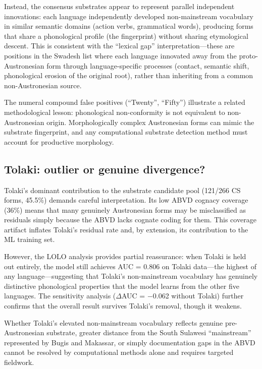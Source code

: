 \documentclass[12pt]{article}
\begin{document}
Instead, the consensus substrates appear to represent parallel independent innovations: each language independently developed non-mainstream vocabulary in similar semantic domains (action verbs, grammatical words), producing forms that share a phonological profile (the fingerprint) without sharing etymological descent.
This is consistent with the ``lexical gap'' interpretation---these are positions in the Swadesh list where each language innovated away from the proto-Austronesian form through language-specific processes (contact, semantic shift, phonological erosion of the original root), rather than inheriting from a common non-Austronesian source.

The numeral compound false positives (``Twenty'', ``Fifty'') illustrate a related methodological lesson: phonological non-conformity is not equivalent to non-Austronesian origin.
Morphologically complex Austronesian forms can mimic the substrate fingerprint, and any computational substrate detection method must account for productive morphology.

\subsection{Tolaki: outlier or genuine divergence?}

Tolaki's dominant contribution to the substrate candidate pool (121/266 CS forms, 45.5\%) demands careful interpretation.
Its low ABVD cognacy coverage (36\%) means that many genuinely Austronesian forms may be misclassified as residuals simply because the ABVD lacks cognate coding for them.
This coverage artifact inflates Tolaki's residual rate and, by extension, its contribution to the ML training set.

However, the LOLO analysis provides partial reassurance: when Tolaki is held out entirely, the model still achieves AUC = 0.806 on Tolaki data---the highest of any language---suggesting that Tolaki's non-mainstream vocabulary has genuinely distinctive phonological properties that the model learns from the other five languages.
The sensitivity analysis ($\Delta$AUC = $-$0.062 without Tolaki) further confirms that the overall result survives Tolaki's removal, though it weakens.

Whether Tolaki's elevated non-mainstream vocabulary reflects genuine pre-Austronesian substrate, greater distance from the South Sulawesi ``mainstream'' represented by Bugis and Makassar, or simply documentation gaps in the ABVD cannot be resolved by computational methods alone and requires targeted fieldwork.
\end{document}
